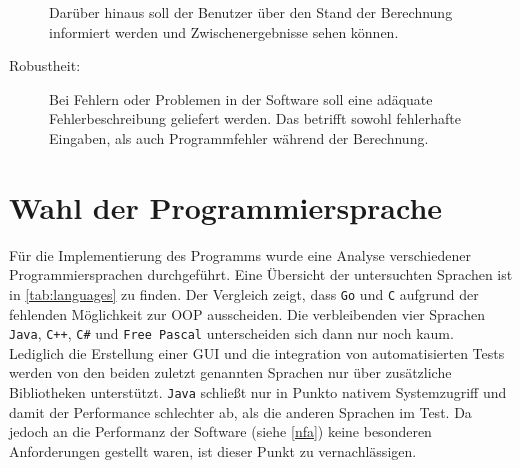 \begin{description}
    Darüber hinaus soll der Benutzer über den Stand der Berechnung informiert werden und Zwischenergebnisse sehen können. 
    
    \item[Robustheit:] Bei Fehlern oder Problemen in der Software soll eine adäquate Fehlerbeschreibung geliefert werden. Das betrifft sowohl fehlerhafte Eingaben, als auch Programmfehler während der Berechnung.
\end{description}




\section{Wahl der Programmiersprache}
\label{sec:language}
Für die Implementierung des Programms wurde eine Analyse verschiedener Programmiersprachen durchgeführt. Eine Übersicht der untersuchten Sprachen ist in \autoref{tab:languages} zu finden. Der Vergleich zeigt, dass \texttt{Go} und \texttt{C} aufgrund der fehlenden Möglichkeit zur \gls{OOP} ausscheiden. Die verbleibenden vier Sprachen \texttt{Java}, \texttt{C++}, \texttt{C\#}  und \texttt{Free Pascal} unterscheiden sich dann nur noch kaum. Lediglich die Erstellung einer \gls{GUI} und die integration von automatisierten Tests werden von den beiden zuletzt genannten Sprachen nur über zusätzliche Bibliotheken unterstützt. \texttt{Java} schließt nur in Punkto nativem Systemzugriff und damit der Performance schlechter ab, als die anderen Sprachen im Test. Da jedoch an die Performanz der Software (siehe \autoref{nfa}) keine besonderen Anforderungen gestellt waren, ist dieser Punkt zu vernachlässigen. 

